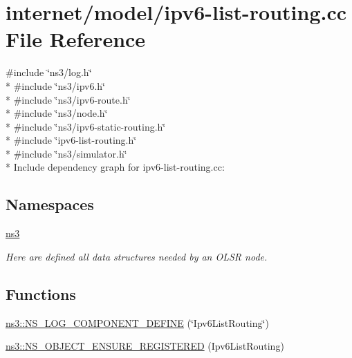 \hypertarget{ipv6-list-routing_8cc}{}\section{internet/model/ipv6-\/list-\/routing.cc File Reference}
\label{ipv6-list-routing_8cc}
{\ttfamily \#include \char`\"{}ns3/log.\+h\char`\"{}}\\*
{\ttfamily \#include \char`\"{}ns3/ipv6.\+h\char`\"{}}\\*
{\ttfamily \#include \char`\"{}ns3/ipv6-\/route.\+h\char`\"{}}\\*
{\ttfamily \#include \char`\"{}ns3/node.\+h\char`\"{}}\\*
{\ttfamily \#include \char`\"{}ns3/ipv6-\/static-\/routing.\+h\char`\"{}}\\*
{\ttfamily \#include \char`\"{}ipv6-\/list-\/routing.\+h\char`\"{}}\\*
{\ttfamily \#include \char`\"{}ns3/simulator.\+h\char`\"{}}\\*
Include dependency graph for ipv6-\/list-\/routing.cc\+:
\subsection*{Namespaces}
\begin{DoxyCompactItemize}
\item 
 \hyperlink{namespacens3}{ns3}
\begin{DoxyCompactList}\small\item\em Here are defined all data structures needed by an O\+L\+SR node. \end{DoxyCompactList}\end{DoxyCompactItemize}
\subsection*{Functions}
\begin{DoxyCompactItemize}
\item 
\hyperlink{namespacens3_affc6216c0ee349cbe2e4284faeb3544c}{ns3\+::\+N\+S\+\_\+\+L\+O\+G\+\_\+\+C\+O\+M\+P\+O\+N\+E\+N\+T\+\_\+\+D\+E\+F\+I\+NE} (\char`\"{}Ipv6\+List\+Routing\char`\"{})
\item 
\hyperlink{namespacens3_a14ec5bfa6684597497491974e6de5259}{ns3\+::\+N\+S\+\_\+\+O\+B\+J\+E\+C\+T\+\_\+\+E\+N\+S\+U\+R\+E\+\_\+\+R\+E\+G\+I\+S\+T\+E\+R\+ED} (Ipv6\+List\+Routing)
\end{DoxyCompactItemize}
